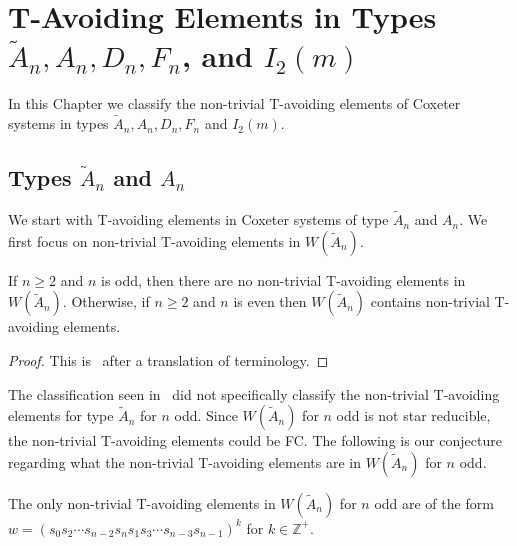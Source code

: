 \chapter{T-Avoiding Elements in Types $\widetilde{A}_n, A_n, D_n, F_n$, and $I_2(m)$}\label{chap:TandTavoid}

In this Chapter we classify the non-trivial T-avoiding elements of Coxeter systems in types $\widetilde{A}_n, A_n, D_n, F_n$ and $I_2(m)$.


\section{Types $\widetilde{A}_n$ and $A_n$}\label{sec:tavoidA}
We start with T-avoiding elements in Coxeter systems of type $\widetilde{A}_n$ and $A_n$. We first focus on non-trivial T-avoiding elements in $W(\widetilde{A}_n)$.

\begin{proposition}
 If $n \geq 2$ and $n$ is odd, then there are no non-trivial T-avoiding elements in $W(\widetilde{A}_n)$. Otherwise, if $n \geq 2$ and $n$ is even then $W(\widetilde{A}_n)$ contains non-trivial T-avoiding elements.
\begin{proof}
	This is~\cite[Proposition~3.1.2]{Fan1999} after a translation of terminology.\qedhere
\end{proof}
\end{proposition}



The classification seen in~\cite{Fan1999} did not specifically classify the non-trivial T-avoiding elements for type $\widetilde{A}_n$ for $n$ odd. Since $W(\widetilde{A}_n)$ for $n$ odd is not star reducible, the non-trivial T-avoiding elements could be FC. The following is our conjecture regarding what the non-trivial T-avoiding elements are in $W(\widetilde{A}_n)$ for $n$ odd.
\begin{conjecture}
	The only non-trivial T-avoiding elements in $W(\widetilde{A}_n)$ for $n$ odd are of the form $w=(s_0s_2 \cdots s_{n-2}s_ns_1s_3 \cdots s_{n-3}s_{n-1})^k$  for $k \in \mathbb{Z}^+$. 
\end{conjecture} 

